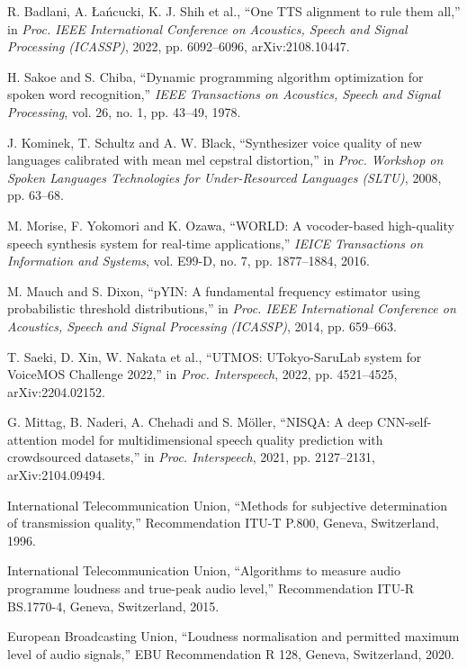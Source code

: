 \documentclass[12pt,a4paper]{article}
\begin{document}
\begin{singlespace}
\begin{enumerate}[label={[\arabic*]},leftmargin=2.3em,itemsep=3pt,topsep=4pt]
  \item R. Badlani, A. Łańcucki, K. J. Shih et al., “One TTS alignment to rule them all,” in \textit{Proc. IEEE International Conference on Acoustics, Speech and Signal Processing (ICASSP)}, 2022, pp. 6092–6096, arXiv:2108.10447.
  \item H. Sakoe and S. Chiba, “Dynamic programming algorithm optimization for spoken word recognition,” \textit{IEEE Transactions on Acoustics, Speech and Signal Processing}, vol. 26, no. 1, pp. 43–49, 1978.
  \item J. Kominek, T. Schultz and A. W. Black, “Synthesizer voice quality of new languages calibrated with mean mel cepstral distortion,” in \textit{Proc. Workshop on Spoken Languages Technologies for Under-Resourced Languages (SLTU)}, 2008, pp. 63–68.
  \item M. Morise, F. Yokomori and K. Ozawa, “WORLD: A vocoder-based high-quality speech synthesis system for real-time applications,” \textit{IEICE Transactions on Information and Systems}, vol. E99-D, no. 7, pp. 1877–1884, 2016.
  \item M. Mauch and S. Dixon, “pYIN: A fundamental frequency estimator using probabilistic threshold distributions,” in \textit{Proc. IEEE International Conference on Acoustics, Speech and Signal Processing (ICASSP)}, 2014, pp. 659–663.
  \item T. Saeki, D. Xin, W. Nakata et al., “UTMOS: UTokyo-SaruLab system for VoiceMOS Challenge 2022,” in \textit{Proc. Interspeech}, 2022, pp. 4521–4525, arXiv:2204.02152.
  \item G. Mittag, B. Naderi, A. Chehadi and S. Möller, “NISQA: A deep CNN-self-attention model for multidimensional speech quality prediction with crowdsourced datasets,” in \textit{Proc. Interspeech}, 2021, pp. 2127–2131, arXiv:2104.09494.
  \item International Telecommunication Union, “Methods for subjective determination of transmission quality,” Recommendation ITU-T P.800, Geneva, Switzerland, 1996.
  \item International Telecommunication Union, “Algorithms to measure audio programme loudness and true-peak audio level,” Recommendation ITU-R BS.1770-4, Geneva, Switzerland, 2015.
  \item European Broadcasting Union, “Loudness normalisation and permitted maximum level of audio signals,” EBU Recommendation R 128, Geneva, Switzerland, 2020.
\end{enumerate}
\end{singlespace}
\clearpage
\end{document}
